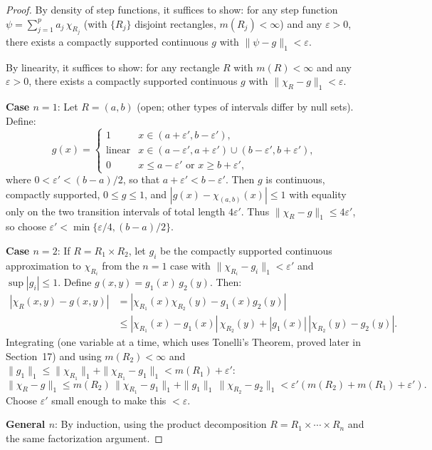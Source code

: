 \documentclass[11pt]{report}
\begin{document}
\begin{proof}
By density of step functions, it suffices to show: for any step function $\psi = \sum_{j=1}^{p} a_j\,\chi_{R_j}$ (with $\{R_j\}$ disjoint rectangles, $m(R_j) < \infty$) and any $\varepsilon > 0$, there exists a compactly supported continuous $g$ with $\|\psi - g\|_1 < \varepsilon$.

By linearity, it suffices to show: for any rectangle $R$ with $m(R) < \infty$ and any $\varepsilon > 0$, there exists a compactly supported continuous $g$ with $\|\chi_R - g\|_1 < \varepsilon$.

\textbf{Case $n = 1$}: Let $R = (a, b)$ (open; other types of intervals differ by null sets). Define:
\[
g(x) = \begin{cases} 1 & x \in (a+\varepsilon', b-\varepsilon'), \\ \text{linear} & x \in (a-\varepsilon', a+\varepsilon') \cup (b-\varepsilon', b+\varepsilon'), \\ 0 & x \leq a - \varepsilon' \text{ or } x \geq b + \varepsilon', \end{cases}
\]
where $0 < \varepsilon' < (b - a)/2$, so that $a + \varepsilon' < b - \varepsilon'$. Then $g$ is continuous, compactly supported, $0 \leq g \leq 1$, and $|g(x) - \chi_{(a,b)}(x)| \leq 1$ with equality only on the two transition intervals of total length $4\varepsilon'$. Thus $\|\chi_R - g\|_1 \leq 4\varepsilon'$, so choose $\varepsilon' < \min\{\varepsilon/4, (b-a)/2\}$.

\textbf{Case $n = 2$}: If $R = R_1 \times R_2$, let $g_i$ be the compactly supported continuous approximation to $\chi_{R_i}$ from the $n = 1$ case with $\|\chi_{R_i} - g_i\|_1 < \varepsilon'$ and $\sup|g_i| \leq 1$. Define $g(x, y) = g_1(x)\,g_2(y)$. Then:
\begin{align*}
|\chi_R(x,y) - g(x,y)| &= |\chi_{R_1}(x)\chi_{R_2}(y) - g_1(x)g_2(y)| \\
&\leq |\chi_{R_1}(x) - g_1(x)|\,\chi_{R_2}(y) + |g_1(x)|\,|\chi_{R_2}(y) - g_2(y)|.
\end{align*}
Integrating (one variable at a time, which uses Tonelli's Theorem, proved later in Section~17) and using $m(R_2) < \infty$ and $\|g_1\|_1 \leq \|\chi_{R_1}\|_1 + \|\chi_{R_1} - g_1\|_1 < m(R_1) + \varepsilon'$:
\[
\|\chi_R - g\|_1 \leq m(R_2)\,\|\chi_{R_1} - g_1\|_1 + \|g_1\|_1\,\|\chi_{R_2} - g_2\|_1 < \varepsilon'(m(R_2) + m(R_1) + \varepsilon').
\]
Choose $\varepsilon'$ small enough to make this $< \varepsilon$.

\textbf{General $n$}: By induction, using the product decomposition $R = R_1 \times \cdots \times R_n$ and the same factorization argument.
\end{proof}
\end{document}
